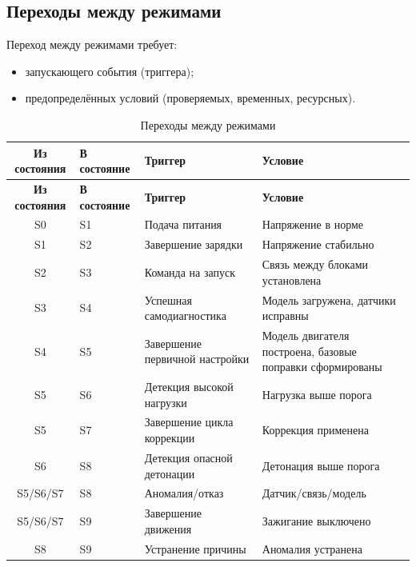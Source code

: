 \documentclass[14pt, a4paper]{extarticle}
\begin{document}
				\subsection{Переходы между режимами}
				
					Переход между режимами требует:
					\begin{itemize}
						\item запускающего события (триггера);
						\item предопределённых условий (проверяемых, временных, ресурсных).
					\end{itemize}
					
					{\fontsize{9}{11}\selectfont
						\begin{xltabular}{\textwidth}{|c|L|L|L|}
						\caption{Переходы между режимами}\label{tab:transitions}\\
						\hline
						\textbf{Из состояния} & \textbf{В состояние} & \textbf{Триггер} & \textbf{Условие} \\
						\hline
						\endfirsthead
						\hline
						\textbf{Из состояния} & \textbf{В состояние} & \textbf{Триггер} & \textbf{Условие} \\
						\hline
						\endhead
						\hline
						\endfoot
						\hline
						\endlastfoot
						S0 & S1 & Подача питания & Напряжение в норме \\
						\hline
						S1 & S2 & Завершение зарядки & Напряжение стабильно \\
						\hline
						S2 & S3 & Команда на запуск & Связь между блоками установлена \\
						\hline
						S3 & S4 & Успешная самодиагностика & Модель загружена, датчики исправны \\
						\hline
						S4 & S5 & Завершение первичной настройки & Модель двигателя построена, базовые поправки сформированы \\
						\hline
						S5 & S6 & Детекция высокой нагрузки & Нагрузка выше порога \\
						\hline
						S5 & S7 & Завершение цикла коррекции & Коррекция применена \\
						\hline
						S6 & S8 & Детекция опасной детонации & Детонация выше порога \\
						\hline
						S5/S6/S7 & S8 & Аномалия/отказ & Датчик/связь/модель \\
						\hline
						S5/S6/S7 & S9 & Завершение движения & Зажигание выключено \\
						\hline
						S8 & S9 & Устранение причины & Аномалия устранена \\

\end{xltabular}}
\end{document}
